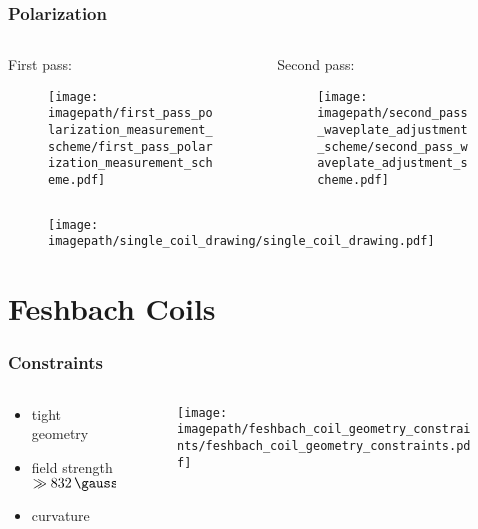 \begin{frame}
    \frametitle{Polarization}
    \begin{columns}
        \begin{column}[]{0.45\textwidth}
            \centering
            First pass:
            \begin{figure}
                \texttt{[image: \\imagepath/first\_pass\_polarization\_measurement\_scheme/first\_pass\_polarization\_measurement\_scheme.pdf]}
            \end{figure}
        \end{column}
        \begin{column}[]{0.55\textwidth}
            \centering
            Second pass:
            \begin{figure}
                \texttt{[image: \\imagepath/second\_pass\_waveplate\_adjustment\_scheme/second\_pass\_waveplate\_adjustment\_scheme.pdf]}
            \end{figure}
        \end{column}
    \end{columns}
\end{frame}

\renewcommand{\imagepath}{\textpath/40-coils/img}

\begin{frame}
    \begin{figure}
        \raggedleft
        \texttt{[image: \\imagepath/single\_coil\_drawing/single\_coil\_drawing.pdf]}
    \end{figure}
    \section{Feshbach Coils}
\end{frame}

\begin{frame}
    \frametitle{Constraints}

    \begin{columns}
        \begin{column}{0.4\textwidth}
            \begin{itemize}
                \item tight geometry
                \item field strength $\gg \SI[]{832}{\gauss}$
                \item curvature
            \end{itemize}
        \end{column}

        \begin{column}{0.55\textwidth}
            \begin{figure}
                \texttt{[image: \\imagepath/feshbach\_coil\_geometry\_constraints/feshbach\_coil\_geometry\_constraints.pdf]}
            \end{figure}
        \end{column}
    \end{columns}
\end{frame}

